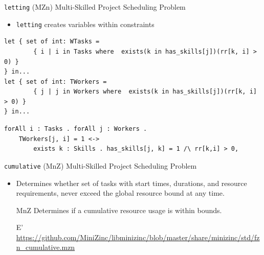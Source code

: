\documentclass{beamer}
\begin{document}
\begin{frame}[containsverbatim]{\texttt{letting} (MZn)}
Multi-Skilled Project Scheduling Problem
\begin{itemize}
    \item \texttt{letting} creates variables within constraints
\end{itemize}
\begin{lstlisting}[basicstyle=\tiny, language=minizinc]
let { set of int: WTasks =
        { i | i in Tasks where  exists(k in has_skills[j])(rr[k, i] > 0) }
} in...
let { set of int: TWorkers = 
        { j | j in Workers where  exists(k in has_skills[j])(rr[k, i] > 0) }
} in...
\end{lstlisting}
\begin{lstlisting}[basicstyle=\tiny, language=eprime]
forAll i : Tasks . forAll j : Workers .
    TWorkers[j, i] = 1 <-> 
        exists k : Skills . has_skills[j, k] = 1 /\ rr[k,i] > 0,
\end{lstlisting}
\end{frame}


\begin{frame}{\texttt{cumulative} (MnZ)}
Multi-Skilled Project Scheduling Problem
\begin{itemize}
    \item Determines whether set of tasks with start times, durations, and resource requirements, never exceed the global resource bound at any time.
    \item[MnZ] Determines if a cumulative resource usage is within bounds.
    \item[E'] \url{https://github.com/MiniZinc/libminizinc/blob/master/share/minizinc/std/fzn_cumulative.mzn}
\end{itemize}
\end{frame}
\end{document}
